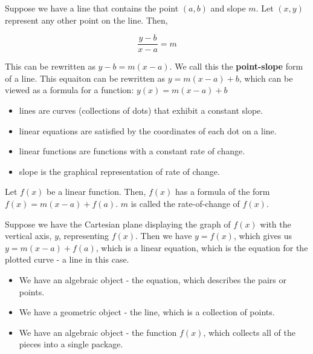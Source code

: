\documentclass{ximera}
\begin{document}
Suppose we have a line that contains the point $(a,b)$ and slope $m$.  Let $(x,y)$ represent any other point on the line.  Then,



\[
\frac{y-b}{x-a} = m
\]

This can be rewritten as $y - b = m(x - a)$. We call this the \textbf{\textcolor{purple!85!blue}{point-slope}} form of a line.  This equaiton can be rewritten as $y = m(x - a) + b$, which can be viewed as a formula for a function: $y(x) = m(x - a) + b$ \\




\begin{itemize}
\item lines are curves (collections of dots) that exhibit a constant slope.
\item linear equations are satisfied by the coordinates of each dot on a line.
\item linear functions are functions with a constant rate of change.
\item slope is the graphical representation of rate of change.
\end{itemize}
















Let $f(x)$ be a linear function.  Then, $f(x)$ has a formula of the form $f(x) = m(x-a) + f(a)$.  $m$ is called the rate-of-change of $f(x)$.


Suppose we have the Cartesian plane displaying the graph of $f(x)$ with the vertical axis, $y$, representing $f(x)$.  Then we have $y = f(x)$, which gives us $y = m(x-a) + f(a)$, which is a linear equation, which is the equation for the plotted curve - a line in this case.

\begin{itemize}
\item We have an algebraic object - the equation, which describes the pairs or points. 
\item We have a geometric object - the line, which is a collection of points. 
\item We have an algebraic object - the function $f(x)$, which collects all of the pieces into a single package. 
\end{itemize}
\end{document}

